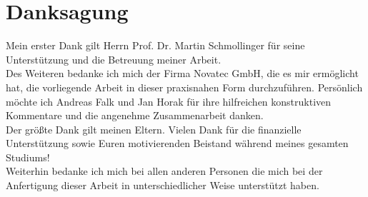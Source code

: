 \chapter{\textbf{Danksagung}} 	%

Mein erster Dank gilt Herrn Prof. Dr. Martin Schmollinger für seine Unterstützung und die Betreuung meiner Arbeit.\\

Des Weiteren bedanke ich mich der Firma Novatec GmbH, die es mir ermöglicht hat, die vorliegende Arbeit in dieser praxisnahen Form durchzuführen. Persönlich möchte ich Andreas Falk und Jan Horak für ihre hilfreichen konstruktiven Kommentare und die angenehme Zusammenarbeit danken.\\

Der größte Dank gilt meinen Eltern. Vielen Dank für die finanzielle Unterstützung sowie Euren motivierenden Beistand während meines gesamten Studiums!\\

Weiterhin bedanke ich mich bei allen anderen Personen die mich bei der Anfertigung dieser Arbeit in unterschiedlicher Weise unterstützt haben.




